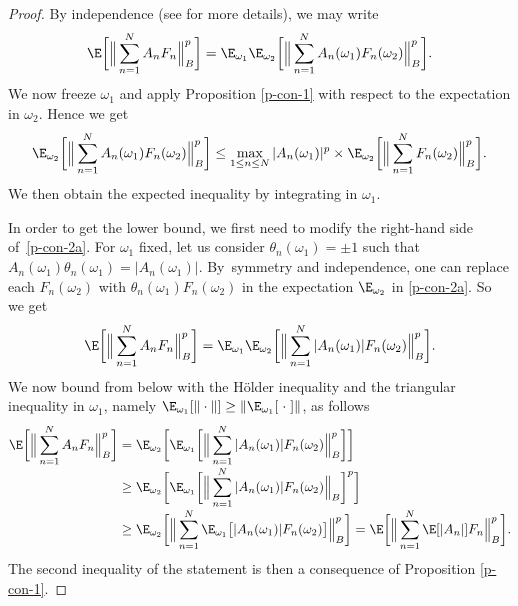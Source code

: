 \begin{proof}
By independence (see \cite[App.\,F]{imek-aif} for more details), we may write
\begin{equation}\label{p-con-2a}
\E\biggl[\Big\| \sum_{n=1}^N A_n F_n \Big\|_{B}^p \biggr]=
\E_{\omega_1} \E_{\omega_2}\biggl[\Big\| \sum_{n=1}^N A_n(\omega_1) F_n(\omega_2) \Big\|_{B}^p \biggr].
\end{equation}
We now freeze $\omega_1$ and apply Proposition \ref{p-con-1} with respect to the expectation in $\omega_2$. Hence we get
\begin{equation*}
\E_{\omega_2}\biggl[\Big\| \sum_{n=1}^N A_n(\omega_1) F_n(\omega_2) \Big\|_{B}^p \biggr] \leq \max_{1\leq n\leq N} |A_n(\omega_1)|^p\times
\E_{\omega_2}\biggl[\Big\| \sum_{n=1}^N F_n(\omega_2) \Big\|_{B}^p \biggr].
\end{equation*}
We then obtain the expected inequality by integrating in $\omega_1$.

In order to get the lower bound, we first need to modify the right-hand side of~\eqref{p-con-2a}.
For $\omega_1$ fixed, let us consider $\theta_n(\omega_1)=\pm 1$ such that $A_n(\omega_1)\theta_n(\omega_1)=|A_n(\omega_1)|$.
By~\hbox{symmetry} and independence, one can replace each $F_n(\omega_2)$ with $\theta_n(\omega_1) F_n(\omega_2)$ in the expectation $\E_{\omega_2}$ in \eqref{p-con-2a}. So we get\vspace*{-3pt}
\begin{equation}\label{symsym}
\E\biggl[\Big\| \sum_{n=1}^N A_n F_n \Big\|_{B}^p \biggr]=
\E_{\omega_1} \E_{\omega_2}\biggl[\Big\| \sum_{n=1}^N |A_n(\omega_1)| F_n(\omega_2) \Big\|_{B}^p \biggr].
\end{equation}
We now bound from below with the Hölder inequality and the triangular inequality in $\omega_1$, namely $\E_{\omega_1}[\|\cdot\|]\geq \|\E_{\omega_1}[\hspace{1 mm}\cdot\hspace{1 mm}]\|$, as follows\vspace*{-3pt}
\begin{align*}
\E\biggl[\Big\| \sum_{n=1}^N A_n F_n \Big\|_{B}^p \biggr]&=
\E_{\omega_2}\biggl[\E_{\omega_1}\biggl[\Big\| \sum_{n=1}^N |A_n(\omega_1)| F_n(\omega_2) \Big\|_{B}^p \biggr]\biggr]\\[-3pt]
&\geq \E_{\omega_2}\biggl[\E_{\omega_1}\biggl[\Big\|\sum_{n=1}^N |A_n(\omega_1)|F_n(\omega_2) \Big\|_B \biggr]^p \biggr]\\[-3pt]
&\geq \E_{\omega_2}\biggl[\Big\|\sum_{n=1}^N \E_{\omega_1}\big[|A_n(\omega_1)|F_n(\omega_2) \big]\Big\|_B^p \biggr]=\E\biggl[\Big\|\sum_{n=1}^N \E[|A_n|]F_n \Big\|_B^p \biggr].
\end{align*}
The second inequality of the statement is then a consequence of Proposition \ref{p-con-1}.
\end{proof}

